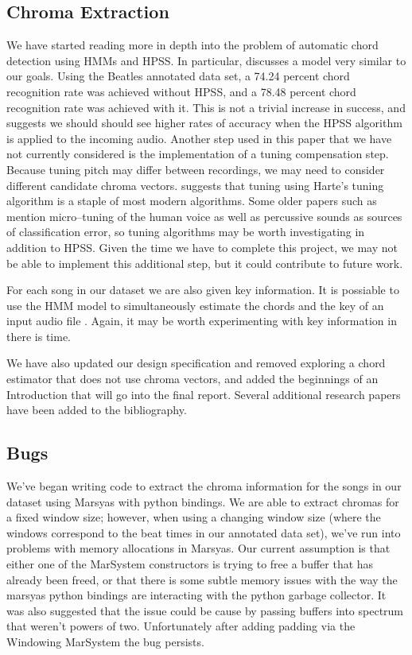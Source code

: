 \documentclass{article}
\begin{document}
\subsection{Chroma Extraction}
We have started reading more in depth into the problem of automatic chord
detection using HMMs and HPSS. In particular, \cite{Ueda:19} discusses a model
very similar to our goals.  Using the Beatles annotated data set, a 74.24
percent chord recognition rate was achieved without HPSS, and a 78.48 percent
chord recognition rate was achieved with it. This is not a trivial increase in
success, and suggests we should should see higher rates of accuracy when the
HPSS algorithm is applied to the incoming audio. Another step used in this
paper that we have not currently considered is the implementation of a tuning
compensation step. Because tuning pitch may differ between recordings, we may
need to consider different candidate chroma vectors.  \cite{McVicar:00}
suggests that tuning using Harte's tuning algorithm is a staple of most modern
algorithms.  Some older papers such as \cite{Zenz:20} mention micro--tuning of
the human voice as well as percussive sounds as sources of classification
error, so tuning algorithms may be worth investigating in addition to HPSS. Given the time we have to complete this project, we may not be able to implement this additional step, but it could contribute to future work.

For each song in our dataset we are also given key information. It is possiable to use the HMM model to simultaneously estimate the chords and the key of an input audio file \cite{McVicar:00}. Again, it may be worth experimenting with key information in there is time.

We have also updated our design specification and removed exploring a chord estimator that does not use chroma vectors, and added the beginnings of an Introduction that will go into the final report. Several additional research papers have been added to the bibliography.

\subsection{Bugs}
We've began writing code to extract the chroma information for the songs in our
dataset using Marsyas with python bindings. We are able to extract chromas for
a fixed window size; however, when using a changing window size (where the
windows correspond to the beat times in our annotated data set), we've run into
problems with memory allocations in Marsyas. Our current assumption is that
either one of the MarSystem constructors is trying to free a buffer that has
already been freed, or that there is some subtle memory issues with the way the
marsyas python bindings are interacting with the python garbage collector. It was also suggested that the issue could be cause by passing buffers into spectrum that weren't powers of two. Unfortunately after adding padding via the Windowing MarSystem the bug persists. 
\end{document}
